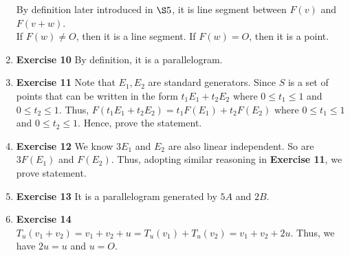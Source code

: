 \documentclass[11pt]{article}
\begin{document}
\begin{enumerate}
By definition later introduced in \(\S 5\), it is line segment between \(F(v)\) and \(F(v+w)\).\\
If \(F(w)\not = O\), then it is a line segment. If \(F(w)=O\), then it is a point.
\item \textbf{Exercise 10}
\label{sec:org2c3562c}
By definition, it is a parallelogram.
\item \textbf{Exercise 11}
\label{sec:org8f457e3}
Note that \(E_1,E_2\) are standard generators.
Since \(S\) is a set of points that can be written in the form \(t_1E_1+t_2E_2\) where \(0\leq t_1\leq 1\) and \(0\leq t_2\leq 1\). Thus, \(F(t_1E_1+t_2E_2)=t_1F(E_1)+t_2F(E_2)\) where \(0\leq t_1\leq 1\) and \(0\leq t_2\leq 1\). Hence, prove the statement.
\item \textbf{Exercise 12}
\label{sec:org7fc929d}
We know \(3E_1\) and \(E_2\) are also linear independent. So are \(3F(E_1)\) and \(F(E_2)\). Thus, adopting similar reasoning in \textbf{Exercise 11}, we prove statement.
\item \textbf{Exercise 13}
\label{sec:org70146b6}
It is a parallelogram generated by \(5A\) and \(2B\).
\item \textbf{Exercise 14}
\label{sec:org746ec97}
\(T_u(v_1+v_2)=v_1+v_2+u=T_u(v_1)+T_u(v_2)=v_1+v_2+2u\). Thus, we have \(2u=u\) and \(u=O\).
\end{enumerate}
\end{document}
